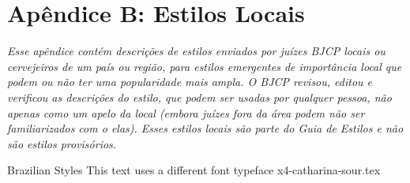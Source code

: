 \clearpage
{}
\divisorLine
\section*{Apêndice B: Estilos Locais}

\textit{Esse apêndice contém descrições de estilos enviados por juízes BJCP locais ou cervejeiros de um país ou região, para estilos emergentes de importância local que podem ou não ter uma popularidade mais ampla. O BJCP revisou, editou e verificou as descrições do estilo, que podem ser usadas por qualquer pessoa, não apenas como um apelo da local (embora juízes fora da área podem não ser familiarizados com o elas). Esses estilos locais são parte do Guia de Estilos e não são estilos provisórios.}

\begin{multicols}{2}

  Brazilian Styles
  {\selectfont
  This text uses a different font typeface
  }
  {x4-catharina-sour.tex}

\end{multicols}